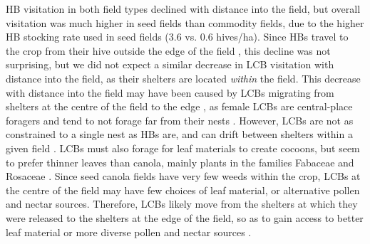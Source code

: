 \documentclass[12pt]{article} %
\begin{document}
HB visitation in both field types declined with distance into the field, but overall visitation was much higher in seed fields than commodity fields, due to the higher HB stocking rate used in seed fields (3.6 vs. 0.6 hives/ha).
Since HBs travel to the crop from their hive outside the edge of the field \citep{robinson2022}, this decline was not surprising, but we did not expect a similar decrease in LCB visitation with distance into the field, as their shelters are located \textit{within} the field.
This decrease with distance into the field may have been caused by LCBs migrating from shelters at the centre of the field to the edge \citep{goerzen1995}, as female LCBs are central-place foragers and tend to not forage far from their nests \citep{peterson2005,pitts2011, brunet2019}.
However, LCBs are not as constrained to a single nest as HBs are, and can drift between shelters within a given field \citep{goerzen1995, pittsSinger2013}.
LCBs must also forage for leaf materials to create cocoons, but seem to prefer thinner leaves than canola, mainly plants in the families Fabaceae and Rosaceae \citep{sinu2018}.
Since seed canola fields have very few weeds within the crop, LCBs at the centre of the field may have few choices of leaf material, or alternative pollen and nectar sources.
Therefore, LCBs likely move from the shelters at which they were released to the shelters at the edge of the field, so as to gain access to better leaf material or more diverse pollen and nectar sources \citep{horne1995, horne1995b}.
\end{document}
